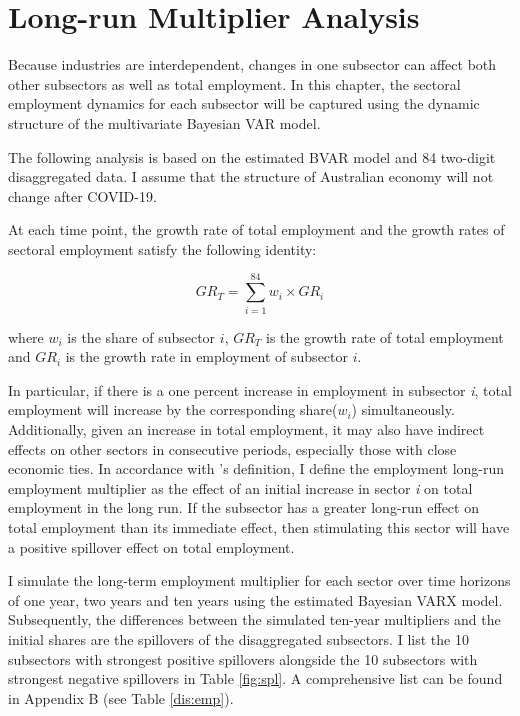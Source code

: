 \documentclass{monashthesis}
\begin{document}
\hypertarget{long-run-multiplier-analysis}{%
\section{Long-run Multiplier Analysis}\label{long-run-multiplier-analysis}}

Because industries are interdependent, changes in one subsector can affect both other subsectors as well as total employment. In this chapter, the sectoral employment dynamics for each subsector will be captured using the dynamic structure of the multivariate Bayesian VAR model.

The following analysis is based on the estimated BVAR model and 84 two-digit disaggregated data. I assume that the structure of Australian economy will not change after COVID-19.

At each time point, the growth rate of total employment and the growth rates of sectoral employment satisfy the following identity:

\[
GR_T=\sum_{i=1}^{84} w_i\times {GR}_i
\]

where \(w_i\) is the share of subsector \(i\), \(GR_T\) is the growth rate of total employment and \(GR_i\) is the growth rate in employment of subsector \(i\).

In particular, if there is a one percent increase in employment in subsector \emph{i}, total employment will increase by the corresponding share(\(w_i\)) simultaneously. Additionally, given an increase in total employment, it may also have indirect effects on other sectors in consecutive periods, especially those with close economic ties. In accordance with \textcite{anderson2020}'s definition, I define the employment long-run employment multiplier as the effect of an initial increase in sector \emph{i} on total employment in the long run. If the subsector has a greater long-run effect on total employment than its immediate effect, then stimulating this sector will have a positive spillover effect on total employment.

I simulate the long-term employment multiplier for each sector over time horizons of one year, two years and ten years using the estimated Bayesian VARX model. Subsequently, the differences between the simulated ten-year multipliers and the initial shares are the spillovers of the disaggregated subsectors. I list the 10 subsectors with strongest positive spillovers alongside the 10 subsectors with strongest negative spillovers in Table \ref{fig:spl}. A comprehensive list can be found in Appendix B (see Table \ref{dis:emp}).
\end{document}
